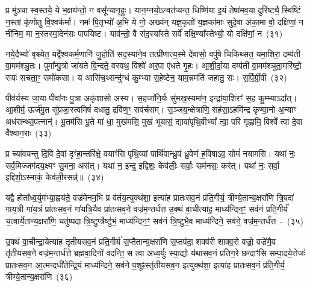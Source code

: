 प्र मु॑ञ्चा स्व॒स्तये॒ ये भ॒क्षय॑न्तो॒ न वसू᳚न्यानृ॒हुः। यान॒ग्नयो॒\-ऽन्वत॑प्यन्त॒ धिष्णि॑या इ॒यं तेषा॑मव॒या दुरि॑ष्ट्यै॒ स्वि॑ष्टिं न॒स्तां कृ॑णोतु वि॒श्वक॑र्मा। नमः॑ पि॒तृभ्यो॑ अ॒भि ये नो॒ अख्य॑न् यज्ञ॒कृतो॑ य॒ज्ञका॑माः सुदे॒वा अ॑का॒मा वो॒ दक्षि॑णां॒ न नी॑निम॒ मा न॒स्तस्मा॒देन॑सः पापयिष्ट। याव॑न्तो॒ वै स॑द॒स्या᳚स्ते सर्वे॑ दक्षि॒ण्या᳚स्तेभ्यो॒ यो दक्षि॑णां॒ न~(३१)\ip

नये॒दैभ्यो॑ वृश्च्येत॒ यद्वै᳚श्वकर्म॒णानि॑ जु॒होति॑ सद॒स्या॑ने॒व तत्प्री॑णात्य॒स्मे दे॑वासो॒ वपु॑षे चिकिथ्सत॒ यमा॒शिरा॒ दम्प॑ती वा॒मम॑श्ञु॒तः। पुमा᳚न्पु॒त्रो जा॑यते वि॒न्दते॒ वस्वथ॒ विश्वे॑ अर॒पा ए॑धते गृ॒हः। आ॒शी॒र्दा॒या दम्प॑ती वा॒मम॑श्ञुता॒मरि॑ष्टो॒ रायः॑ सचता॒ꣳ॒ समो॑कसा। य आसि॑च॒थ्सन्दु॑ग्धं कु॒म्भ्या स॒हेष्टेन॒ याम॒न्नम॑तिं जहातु॒ सः। स॒र्पि॒र्ग्री॒वी~(३२)\ip


पीव॑र्यस्य जा॒या पीवा॑नः पु॒त्रा अकृ॑शासो अस्य। स॒हजा॑नि॒र्यः सु॑मख॒स्यमा॑न॒ इन्द्रा॑या॒शिरꣳ॑ स॒ह कु॒म्भ्या\-ऽदा᳚त्। आ॒शीर्म॒ ऊर्ज॑मु॒त सु॑प्रजा॒स्त्वमिषं॑ दधातु॒ द्रवि॑ण॒ꣳ॒ सव॑र्चसम्। स॒ञ्जय॒न्क्षेत्रा॑णि॒ सह॑सा॒\-ऽहमि॑न्द्र कृण्वा॒नो अ॒न्याꣳ अध॑रान्थ्स॒पत्नान्॑। भू॒तम॑सि भू॒ते मा॑ धा॒ मुख॑मसि॒ मुखं॑ भूयासं॒ द्यावा॑\-पृथि॒वी\-भ्यां᳚ त्वा॒ परि॑ गृह्णामि॒ विश्वे᳚ त्वा दे॒वा वै᳚श्वान॒राः~(३३)\ip

प्र च्या॑वयन्तु दि॒वि दे॒वां दृꣳ॑हा॒न्तरि॑क्षे॒ वयाꣳ॑सि पृथि॒व्यां पार्थि॑वान्ध्रु॒वं ध्रु॒वेण॑ ह॒विषा\-ऽव॒ सोमं॑ नयामसि। यथा॑ नः॒ सर्व॒मिज्जग॑दय॒क्ष्मꣳ सु॒मना॒ अस॑त्। यथा॑ न॒ इन्द्र॒ इद्विशः॒ केव॑लीः॒ सर्वाः॒ सम॑नसः॒ कर॑त्। यथा॑ नः॒ सर्वा॒ इद्दिशो॒\-ऽस्माकं॒ केव॑ली॒रसन्न्॑॥~(३४)\ip

{\anuvakamend[{एन॑सा विश्वकर्म॒न्॒ यो दक्षि॑णां॒ न स॑र्पिर्ग्री॒वी वै᳚श्वान॒राश्च॑त्वारि॒ꣳ॒शच्च॑}]}

यद्वै होता᳚ध्व॒र्युम॑भ्या॒ह्वय॑ते॒ वज्र॑मेनम॒भि प्र व॑र्तय॒त्युक्थ॑शा॒ इत्या॑ह प्रातःसव॒नं प्र॑ति॒गीर्य॒ त्रीण्ये॒तान्य॒क्षरा॑णि त्रि॒पदा॑ गाय॒त्री गा॑य॒त्रं प्रा॑तःसव॒नं गा॑यत्रि॒यैव प्रा॑तःसव॒ने वज्र॑म॒न्तर्ध॑त्त उ॒क्थं वा॒चीत्या॑ह॒ माध्य॑न्दिन॒ꣳ॒ सव॑नं प्रति॒गीर्य॑ च॒त्वार्ये॒तान्य॒क्षरा॑णि॒ चतु॑ष्पदा त्रि॒ष्टुप्त्रैष्टु॑भं॒ माध्य॑न्दिन॒ꣳ॒ सव॑नं त्रि॒ष्टुभै॒व माध्य॑न्दिने॒ सव॑ने॒ वज्र॑म॒न्तर्ध॑त्त~-~(३५)\ip

उ॒क्थं वा॒चीन्द्रा॒येत्या॑ह तृतीय\-सव॒नं प्र॑ति॒गीर्य॑ स॒प्तैतान्य॒क्षरा॑णि स॒प्तप॑दा॒ शक्व॑री शाक्व॒रो वज्रो॒ वज्रे॑णै॒व तृ॑तीय\-सव॒ने वज्र॑म॒न्तर्ध॑त्ते ब्रह्मवा॒दिनो॑ वदन्ति॒ स त्वा अ॑ध्व॒र्युः स्या॒द्यो य॑थासव॒नं प्र॑तिग॒रे छन्दाꣳ॑सि सम्पा॒दये॒त्तेजः॑ प्रातःसव॒न आ॒त्मन्दधी॑तेन्द्रि॒यं माध्य॑न्दिने॒ सव॑ने प॒शूꣴस्तृ॑तीय\-सव॒न इत्युक्थ॑शा॒ इत्या॑ह प्रातःसव॒नं प्र॑ति॒गीर्य॒ त्रीण्ये॒तान्य॒क्षरा॑णि~(३६)\ip

